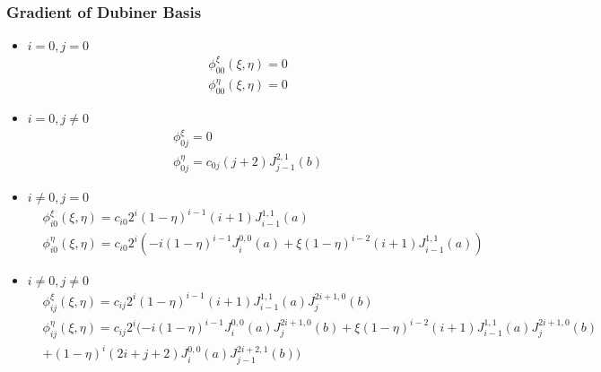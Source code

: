 \documentclass[a4paper]{article}
\begin{document}
\subsubsection{Gradient of Dubiner Basis}
    \begin{itemize}[label=\textendash]
	\item $i=0,j=0$
	\begin{equation}
	\begin{split}
	&\phi_{00}^{\xi}(\xi,\eta)=0
	\\&\phi_{00}^{\eta}(\xi,\eta)=0
	\end{split}
	\end{equation}
	\item $i=0,j\neq0$
	\begin{equation}
	\begin{split}
	&\phi_{0j}^{\xi}=0
	\\&\phi_{0j}^{\eta}=c_{0j} (j+2) J_{j-1}^{2,1}(b)
	\end{split}
	\end{equation}
	\item $i\neq0,j=0$
	\begin{equation}
	\begin{split}
	&\phi_{i0}^{\xi}(\xi,\eta)=c_{i0} 2^{i} (1-\eta)^{i-1} (i+1) J_{i-1}^{1,1}(a)
	\\&\phi_{i0}^{\eta}(\xi,\eta)=c_{i0} 2^{i} (-i(1-\eta)^{i-1} J_{i}^{0,0}(a)+\xi(1-\eta)^{i-2}(i+1) J_{i-1}^{1,1}(a))
	\end{split}
	\end{equation}
	\item $i\neq0,j\neq0$
	\begin{equation}
	\begin{split}
	&\phi_{ij}^{\xi}(\xi,\eta)=c_{ij} 2^{i} (1-\eta)^{i-1} (i+1) J_{i-1}^{1,1}(a) J_{j}^{2i+1,0}(b)
	\\&\phi_{ij}^{\eta}(\xi,\eta)=c_{ij} 2^{i} (-i(1-\eta)^{i-1} J_{i}^{0,0}(a) J_{j}^{2i+1,0}(b)+\xi(1-\eta)^{i-2}(i+1) J_{i-1}^{1,1}(a) J_{j}^{2i+1,0}(b)
	\\&+(1-\eta)^{i}(2i+j+2) J_{i}^{0,0}(a) J_{j-1}^{2i+2,1}(b))
	\end{split}
	\end{equation}
	\end{itemize}
\vspace{5mm}
\end{document}
